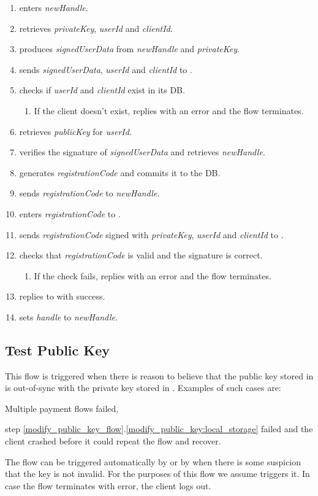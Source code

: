 \documentclass[a4paper,10pt,draft]{article}
\newcommand{\signedUserData}{\emph{signedUserData}}
\newcommand{\handle}{\emph{handle}}
\newcommand{\registrationCode}{\emph{registrationCode}}
\newcommand{\privateKey}{\emph{privateKey}}
\newcommand{\publicKey}{\emph{publicKey}}
\newcommand{\userId}{\emph{userId}}
\newcommand{\clientId}{\emph{clientId}}
\newcommand{\newHandle}{\emph{newHandle}}
\begin{document}
\begin{enumerate}
 \item \User{} enters \newHandle{}.
 \item \Client{} retrieves \privateKey{}, \userId{} and \clientId{}.
 \item \Client{} produces \signedUserData{} from \newHandle{} and \privateKey{}.
 \item \Client{} sends \signedUserData{}, \userId{} and \clientId{} to 
\Server{}.
 \item \Server{} checks if \userId{} and \clientId{} exist in its DB.
 \begin{enumerate}
  \item If the client doesn't exist, \Server{} replies with an error and the 
flow terminates.
 \end{enumerate}
 \item \Server{} retrieves \publicKey{} for \userId{}.
 \item \Server{} verifies the signature of \signedUserData{} and retrieves 
\newHandle{}.
 \item \Server{} generates \registrationCode{} and commits it to the DB.
 \item \Server{} sends \registrationCode{} to \newHandle{}.
 \item \User{} enters \registrationCode{} to \Client{}.
 \item \Client{} sends \registrationCode{} signed with \privateKey{}, \userId{} 
and \clientId{} to \Server{}.
 \item \Server{} checks that \registrationCode{} is valid and the signature is 
correct.
 \begin{enumerate}
  \item If the check fails, \Server{} replies with an error and the flow 
terminates.
 \end{enumerate}
 \item \Server{} replies to \Client{} with success.
 \item \Client{} sets \handle{} to \newHandle{}.
\end{enumerate}

\subsection{Test Public Key}
\label{test_public_key_flow}
This flow is triggered when there is reason to believe that the public key 
stored in \Server{} is out-of-sync with the private key stored in \Client{}. 
Examples of such cases are:\begin{inparaenum}[(a)] \item Multiple payment 
flows failed, \item 
step \ref{modify_public_key_flow}.\ref{modify_public_key:local_storage} failed 
and the client crashed before it could repeat the flow and recover. 
\end{inparaenum}The flow can be triggered automatically by \Client{} or by 
\User{} when there is some suspicion that the key is not invalid. For the 
purposes of this flow we assume \Client{} triggers it. In case the flow 
terminates with error, the client logs out.
\end{document}
